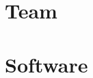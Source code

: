 \documentclass[8pt]{book}
\begin{document}
    \chapter{Team}
      
      
    \chapter{Software}
       
       
    
  
           


%         
        

%         
%         
    
%         


%         
    
%           
%         
%          
%           
%         
%         

    
%     
\end{document}
